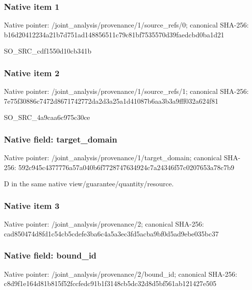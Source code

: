 \documentclass[10pt,a4paper]{article}
\begin{document}
\subsubsection{Native item 1}


Native pointer: /joint\_analysis/provenan\allowbreak{}ce/1/source\_refs/0; canonical SHA-256: b16d20412234a21b7d751ad1\allowbreak{}48856511c79c81bf7535570d\allowbreak{}39faedcbd0ba1d21


SO\_SRC\_cdf1550d10cb341b


\subsubsection{Native item 2}


Native pointer: /joint\_analysis/provenan\allowbreak{}ce/1/source\_refs/1; canonical SHA-256: 7e75f30886c7472d86717427\allowbreak{}72da2d3a25a1d41087b6aa3b\allowbreak{}3a9fff032a624f81


SO\_SRC\_4a9caa6c975c30ce


\subsubsection{Native field: target\_domain}


Native pointer: /joint\_analysis/provenan\allowbreak{}ce/1/target\_domain; canonical SHA-256: 592c945c4377776a57a040b6\allowbreak{}f7728747634924c7a24346f5\allowbreak{}7c0207653a78c7b9


D in the same native view/guarantee/quantity/resource.


\subsubsection{Native item 3}


Native pointer: /joint\_analysis/provenance/2; canonical SHA-256: cad850474d8fd1c54cb5cdef\allowbreak{}e3ba6c4a5a3ec3fd5acba9bf\allowbreak{}0d5ad9ebe035bc37



\subsubsection{Native field: bound\_id}


Native pointer: /joint\_analysis/provenance/2/bound\_id; canonical SHA-256: c8d9f1e164d81b815f52fccf\allowbreak{}edc91b1f3148cb5dc32d8d5b\allowbreak{}f561ab121427e505
\end{document}
